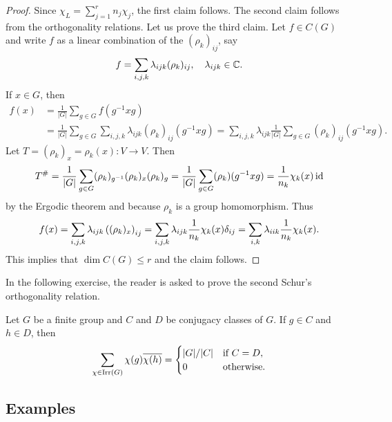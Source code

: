 \begin{proof}
    Since $\chi_L=\sum_{j=1}^rn_j\chi_j$, the first claim follows. 
    The second claim follows from the orthogonality relations. Let us prove the third claim. Let $f\in C(G)$ and write $f$ 
    as a linear combination of the $(\rho_k)_{ij}$, say
    \[
    f=\sum_{i,j,k}\lambda_{ijk}(\rho_k)_{ij},\quad\lambda_{ijk}\in\mathbb{C}.
    \]
    If $x\in G$, then 
    \begin{align*}
    f(x)&=\frac{1}{|G|}\sum_{g\in G}f(g^{-1}xg)\\
    &=\frac{1}{|G|}\sum_{g\in G}\sum_{i,j,k}\lambda_{ijk}(\rho_k)_{ij}(g^{-1}xg)
    =\sum_{i,j,k}\lambda_{ijk} \frac{1}{|G|}\sum_{g\in G}(\rho_k)_{ij}(g^{-1}xg). 
    \end{align*}
    Let $T=(\rho_k)_x=\rho_k(x)\colon V\to V$. Then
    \[
    T^{\#}=\frac{1}{|G|}\sum_{g\in G}(\rho_k)_{g^{-1}}(\rho_k)_x(\rho_k)_g
    =\frac{1}{|G|}\sum_{g\in G}(\rho_k)(g^{-1}xg)
    =\frac{1}{n_k}\chi_k(x)\operatorname{id}
    \]
    by the Ergodic theorem and because 
    $\rho_k$ is a group homomorphism. Thus 
    \[
    f(x)=\sum_{i,j,k}\lambda_{ijk} \left((\rho_k)_x\right)_{ij}
    =\sum_{i,j,k}\lambda_{ijk}\frac{1}{n_k}\chi_k(x)\delta_{ij}
    =\sum_{i,k}\lambda_{iik}\frac{1}{n_k}\chi_k(x).\qedhere 
    \]
    This implies that $\dim C(G)\leq r$ and the claim follows. 
\end{proof}

In the following exercise, the reader is asked to prove the second 
Schur's orthogonality relation. 

\begin{exercise}
    Let $G$ be a finite group and 
    $C$ and $D$ be conjugacy classes of $G$. If $g\in C$ and $h\in D$, then
    \[
    \sum_{\chi\in\operatorname{Irr}(G)}\chi(g)\overline{\chi(h)}=
    \begin{cases}
    |G|/|C| & \text{if $C=D$},\\
    0 & \text{otherwise}.
    \end{cases}
    \]
\end{exercise}

\subsection{Examples}

